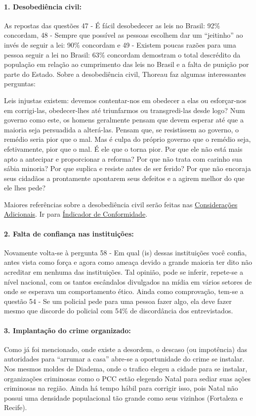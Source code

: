 \documentclass[
	12pt,				%
	openright,			%
	twoside,			%
	a4paper,			%
	chapter=TITLE,		%
	section=TITLE,		%
	subsection=TITLE,	%
	subsubsection=TITLE,%
	spanish,            %
	english,			%
	brazil				%
	]{abntex2}
\begin{document}
\paragraph*{\textbf{1. Desobediência civil:}} As repostas das questões 47 - É fácil desobedecer as leis no Brasil: 92\% concordam, 48 - Sempre que possível as pessoas escolhem dar um “jeitinho” ao invés de seguir a lei: 90\% concordam e 49 - Existem poucas razões para uma pessoa seguir a lei no Brasil: 63\% concordam demostram o total descrédito da população em relação ao cumprimento das leis no Brasil e a falta de punição por parte do Estado. Sobre a desobediência civil, Thoreau faz algumas interessantes perguntas:
\begin{citacao}
	Leis  injustas  existem:  devemos  contentar-nos  em  obedecer  a  elas  ou  esforçar-nos  em corrigi-las, obedecer-lhes até triunfarmos ou transgredi-las desde logo? Num governo como este, os homens geralmente pensam que devem esperar até que a maioria seja persuadida a alterá-las. Pensam que, se resistissem ao governo, o remédio seria pior que o mal. Mas é culpa do próprio governo que o remédio seja, efetivamente, pior que o mal. É ele que o torna pior. Por que ele não está  mais  apto  a  antecipar  e  proporcionar  a  reforma?  Por  que  não  trata  com  carinho  sua  sábia minoria?  Por  que  suplica  e  resiste  antes  de  ser  ferido?  Por  que  não  encoraja  seus  cidadãos  a prontamente apontarem seus defeitos e a agirem melhor do que ele lhes pede? \cite[p.~5]{Thoreau}
\end{citacao}
Maiores referências sobre a desobediência civil serão feitas nas \hyperlink{CA2}{Considerações Adicionais}. Ir para \hyperlink{Conf1}{Índicador de Conformidade}.
\hypertarget{T2}{}
\paragraph*{\textbf{2. Falta de confiança nas instituições:}} Novamente volta-se à pergunta 58 - Em qual (is) dessas instituições você confia, antes vista como força e agora como ameaça devido a grande maioria ter dito não acreditar em nenhuma das instituições. Tal opinião, pode se inferir, repete-se a nível nacional, com os tantos escândalos divulgados na mídia em vários setores de onde se esperava um comportamento ético. 
Ainda como comprovação, tem-se a questão 54 - Se um policial pede para uma pessoa fazer algo, ela deve fazer mesmo que discorde do policial com 54\% de discordância dos entrevistados.
\hypertarget{T3}{}
\paragraph*{\textbf{3. Implantação do crime organizado:}} Como já foi mencionado, onde existe a desordem, o descaso (ou impotência) das autoridades para “arrumar a casa” abre-se a oportunidade do crime se instalar. Nos mesmos moldes de Diadema, onde o trafico elegeu a cidade para se instalar, organizações criminosas como o PCC estão elegendo Natal para sediar suas ações criminosas na região. Ainda há tempo hábil para corrigir isso, pois Natal não possui uma densidade populacional tão grande como seus vizinhos (Fortaleza e Recife).
\hypertarget{T4}{}
\end{document}
